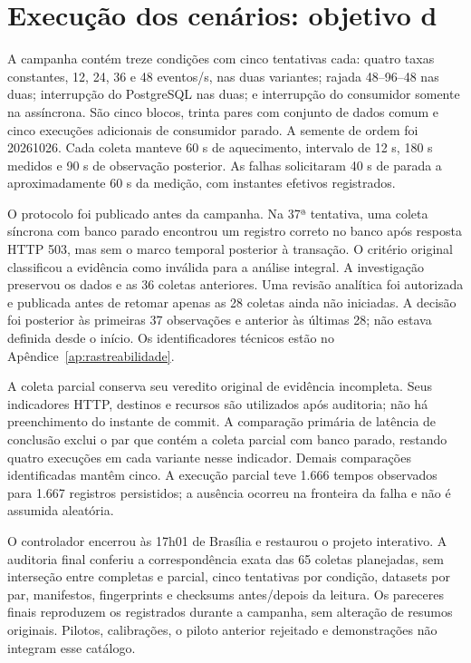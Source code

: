 \section{Execução dos cenários: objetivo d}
\label{sec:campanha-final}
A campanha contém treze condições com cinco tentativas cada: quatro taxas constantes, 12, 24, 36 e 48 eventos/s, nas duas variantes; rajada 48--96--48 nas duas; interrupção do PostgreSQL nas duas; e interrupção do consumidor somente na assíncrona. São cinco blocos, trinta pares com conjunto de dados comum e cinco execuções adicionais de consumidor parado. A semente de ordem foi 20261026. Cada coleta manteve 60 s de aquecimento, intervalo de 12 s, 180 s medidos e 90 s de observação posterior. As falhas solicitaram 40 s de parada a aproximadamente 60 s da medição, com instantes efetivos registrados.

O protocolo foi publicado antes da campanha. Na 37ª tentativa, uma coleta síncrona com banco parado encontrou um registro correto no banco após resposta HTTP 503, mas sem o marco temporal posterior à transação. O critério original classificou a evidência como inválida para a análise integral. A investigação preservou os dados e as 36 coletas anteriores. Uma revisão analítica foi autorizada e publicada antes de retomar apenas as 28 coletas ainda não iniciadas. A decisão foi posterior às primeiras 37 observações e anterior às últimas 28; não estava definida desde o início. Os identificadores técnicos estão no Apêndice~\ref{ap:rastreabilidade}.

A coleta parcial conserva seu veredito original de evidência incompleta. Seus indicadores HTTP, destinos e recursos são utilizados após auditoria; não há preenchimento do instante de commit. A comparação primária de latência de conclusão exclui o par que contém a coleta parcial com banco parado, restando quatro execuções em cada variante nesse indicador. Demais comparações identificadas mantêm cinco. A execução parcial teve 1.666 tempos observados para 1.667 registros persistidos; a ausência ocorreu na fronteira da falha e não é assumida aleatória.

O controlador encerrou às 17h01 de Brasília e restaurou o projeto interativo. A auditoria final conferiu a correspondência exata das 65 coletas planejadas, sem interseção entre completas e parcial, cinco tentativas por condição, datasets por par, manifestos, fingerprints e checksums antes/depois da leitura. Os pareceres finais reproduzem os registrados durante a campanha, sem alteração de resumos originais. Pilotos, calibrações, o piloto anterior rejeitado e demonstrações não integram esse catálogo.

